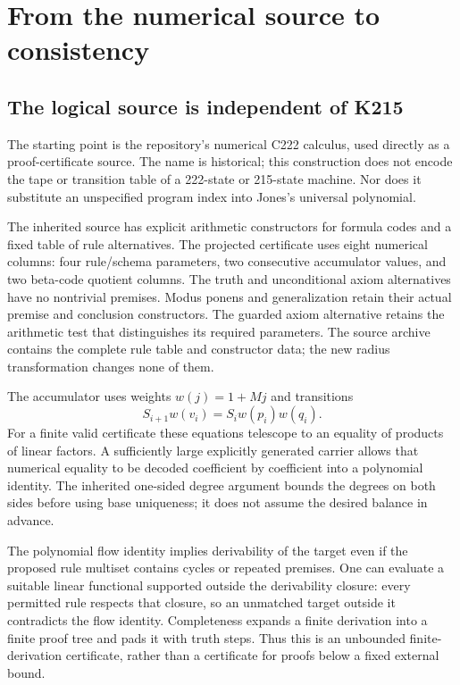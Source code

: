 \section{From the numerical source to consistency}\label{sec:calibration}
\subsection{The logical source is independent of K215}

The starting point is the repository's numerical C222 calculus, used directly as a proof-certificate source. The name is historical; this construction does not encode the tape or transition table of a 222-state or 215-state machine. Nor does it substitute an unspecified program index into Jones's universal polynomial.

The inherited source has explicit arithmetic constructors for formula codes and a fixed table of rule alternatives. The projected certificate uses eight numerical columns: four rule/schema parameters, two consecutive accumulator values, and two beta-code quotient columns. The truth and unconditional axiom alternatives have no nontrivial premises. Modus ponens and generalization retain their actual premise and conclusion constructors. The guarded axiom alternative retains the arithmetic test that distinguishes its required parameters. The source archive contains the complete rule table and constructor data; the new radius transformation changes none of them.\cite{repository,archive}

The accumulator uses weights \(w(j)=1+Mj\) and transitions
\[
S_{i+1}w(v_i)=S_iw(p_i)w(q_i).
\]
For a finite valid certificate these equations telescope to an equality of products of linear factors. A sufficiently large explicitly generated carrier allows that numerical equality to be decoded coefficient by coefficient into a polynomial identity. The inherited one-sided degree argument bounds the degrees on both sides before using base uniqueness; it does not assume the desired balance in advance.

The polynomial flow identity implies derivability of the target even if the proposed rule multiset contains cycles or repeated premises. One can evaluate a suitable linear functional supported outside the derivability closure: every permitted rule respects that closure, so an unmatched target outside it contradicts the flow identity. Completeness expands a finite derivation into a finite proof tree and pads it with truth steps. Thus this is an unbounded finite-derivation certificate, rather than a certificate for proofs below a fixed external bound.

